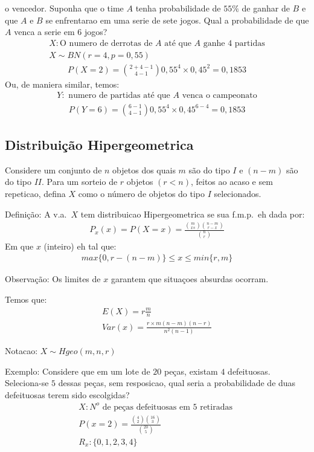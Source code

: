 \begin{description}
      o vencedor. Suponha que o time $A$ tenha probabilidade de $55\%$ de ganhar de $B$ e que $A$ e $B$ 
      se enfrentarao em uma serie de sete jogos. Qual a probabilidade de que $A$ venca a serie em 6 jogos?
     \begin{align*} 
       X:\text{O numero de derrotas de $A$ até que $A$ ganhe 4 partidas}\\
       X \mathtt{\sim}BN (r=4, p=0,55)
     \end{align*}
     \begin{align*}
       P(X=2)=\binom{2+4-1}{4-1} 0,55^{4}\times 0,45^{2}=0,1853
     \end{align*}
     Ou, de maniera similar, temos:
     \begin{align*}
       Y: \text{ numero de partidas até que $A$ venca o campeonato}
     \end{align*}
     \begin{align*}
       P(Y=6)= \binom{6-1}{4-1} 0,55^{4} \times 0,45^{6-4} = 0,1853
     \end{align*}
 \end{description}
 \subsection{Distribuição Hipergeometrica}
Considere um conjunto de $n$ objetos dos quais $m$ são do tipo $I$
e $(n-m) $ são do tipo $II$. Para um sorteio de $r$ objetos $(r<n)$, 
feitos ao acaso e sem repeticao, defina $X$ como o número de objetos do tipo
$I$ selecionados.
\begin{description}
  \item{Definição}: A v.a.\ $X$ tem distribuicao Hipergeometrica se sua f.m.p.\ eh dada
    por:
    \begin{align*}
      P_x(x)= P(X=x)= \frac{\binom{m}{xs} \binom{n-m}{r-x}}{\binom{n}{r}}
    \end{align*}
    Em que $x$ (inteiro) eh tal que:
    \begin{align*}
      max \{0,r-(n-m)\} \leq x \leq min \{ r,m \}
    \end{align*}
  \item{Observação}: Os limites de $x$ garantem que situaçoes absurdas ocorram.
  \item{Temos que: }
    \begin{align*}
      E(X) = r \frac{m}{n} \\
      Var(x)= \frac{r\times m (n-m)(n-r)}{n^2 (n-1)}
    \end{align*}
  \item{Notacao}: $X \mathtt{\sim} Hgeo (m,n,r)$
  \item{Exemplo}: Considere que em um lote de $20$ peças, existam $4$ defeituosas.
    Seleciona-se $5$ dessas peças, sem resposicao, qual seria a probabilidade 
    de duas defeituosas terem sido escolgidas?
    \begin{align*}
      X: \text{$N^{o}$  de peças defeituosas em $5$ retiradas }\\
      P(x=2)=\frac{\binom{4}{2} \binom{16}{3}}{\binom{20}{5}}\\
      R_{x}: \{ 0,1,2,3,4 \}
    \end{align*}
\end{description}
